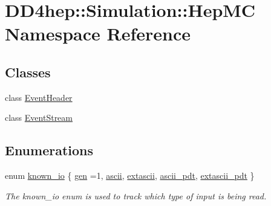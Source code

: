 \hypertarget{namespace_d_d4hep_1_1_simulation_1_1_hep_m_c}{}\section{D\+D4hep\+:\+:Simulation\+:\+:Hep\+MC Namespace Reference}
\label{namespace_d_d4hep_1_1_simulation_1_1_hep_m_c}
\subsection*{Classes}
\begin{DoxyCompactItemize}
\item 
class \hyperlink{class_d_d4hep_1_1_simulation_1_1_hep_m_c_1_1_event_header}{Event\+Header}
\item 
class \hyperlink{class_d_d4hep_1_1_simulation_1_1_hep_m_c_1_1_event_stream}{Event\+Stream}
\end{DoxyCompactItemize}
\subsection*{Enumerations}
\begin{DoxyCompactItemize}
\item 
enum \hyperlink{namespace_d_d4hep_1_1_simulation_1_1_hep_m_c_abd57f9534b4e3e74fa2e5f25525d452c}{known\+\_\+io} \{ \newline
\hyperlink{namespace_d_d4hep_1_1_simulation_1_1_hep_m_c_abd57f9534b4e3e74fa2e5f25525d452ca1851fc44abe80e919efb31e16f25abae}{gen} =1, 
\hyperlink{namespace_d_d4hep_1_1_simulation_1_1_hep_m_c_abd57f9534b4e3e74fa2e5f25525d452caa170d10707fb62bbdffdc5e2a65834fd}{ascii}, 
\hyperlink{namespace_d_d4hep_1_1_simulation_1_1_hep_m_c_abd57f9534b4e3e74fa2e5f25525d452ca35d3a404a7b5dcdd485900294bbba4cc}{extascii}, 
\hyperlink{namespace_d_d4hep_1_1_simulation_1_1_hep_m_c_abd57f9534b4e3e74fa2e5f25525d452ca17b19f25d74815dc415a5fde0f894f2d}{ascii\+\_\+pdt}, 
\newline
\hyperlink{namespace_d_d4hep_1_1_simulation_1_1_hep_m_c_abd57f9534b4e3e74fa2e5f25525d452ca951f0ef82695d1e0a1353c5237a3dbcc}{extascii\+\_\+pdt}
 \}\begin{DoxyCompactList}\small\item\em The known\+\_\+io enum is used to track which type of input is being read. \end{DoxyCompactList}
\end{DoxyCompactItemize}
